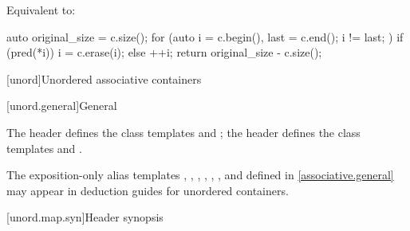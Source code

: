 \begin{itemdescr}
\pnum
\effects
Equivalent to:
\begin{codeblock}
auto original_size = c.size();
for (auto i = c.begin(), last = c.end(); i != last; ) {
  if (pred(*i)) {
    i = c.erase(i);
  } else {
    ++i;
  }
}
return original_size - c.size();
\end{codeblock}
\end{itemdescr}

[unord]{Unordered associative containers}

[unord.general]{General}

\pnum
The header  defines the class
templates  and ;
the header  defines the class
templates  and .

\pnum
The exposition-only alias templates
, ,
, ,
, ,
and 
defined in \ref{associative.general} may appear in deduction guides for unordered containers.

[unord.map.syn]{Header  synopsis}

